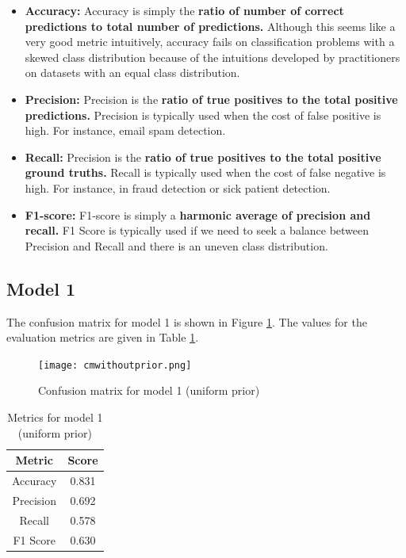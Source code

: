 \documentclass[conference]{IEEEtran}
\begin{document}
\begin{itemize}
    \item \textbf{Accuracy:}
    Accuracy is simply the \textbf{ratio of number of correct predictions to total number of predictions.} Although this seems like a very good metric intuitively, accuracy fails on classification problems with a skewed class distribution because of the intuitions developed by practitioners on datasets with an equal class distribution.
    \item \textbf{Precision:}
    Precision is the \textbf{ratio of true positives to the total positive predictions.} Precision is typically used when the cost of false positive is high. For instance, email spam detection.
    \item \textbf{Recall:}
    Precision is the \textbf{ratio of true positives to the total positive ground truths.} Recall is typically used when the cost of false negative is high. For instance, in fraud detection or sick patient detection.
    \item \textbf{F1-score:}
    F1-score is simply a \textbf{harmonic average of precision and recall.} F1 Score is typically used if we need to seek a balance between Precision and Recall and there is an uneven class distribution.
    
    
\end{itemize}

\subsection{Model 1}

The confusion matrix for model 1 is shown in Figure \ref{cmwithoutprior}. The values for the evaluation metrics are given in Table \ref{noprior_metric_table}.

\begin{figure}[tbh]
\centering
\texttt{[image: cmwithoutprior.png]}
\caption{Confusion matrix for model 1 (uniform prior)}
\label{cmwithoutprior}
\end{figure}

\begin{table}
\begin{center}

\caption{Metrics for model 1 (uniform prior)}

\begin{tabular}{| c| c| }
 \hline
 Metric & Score \\
 \hline
 \hline
 Accuracy & 0.831 \\ 
 \hline
 Precision & 0.692 \\   
 \hline
 Recall & 0.578 \\
 \hline
 F1 Score & 0.630 \\
 \hline

\end{tabular}

\label{noprior_metric_table}
\end{center}

\end{table}
\end{document}
